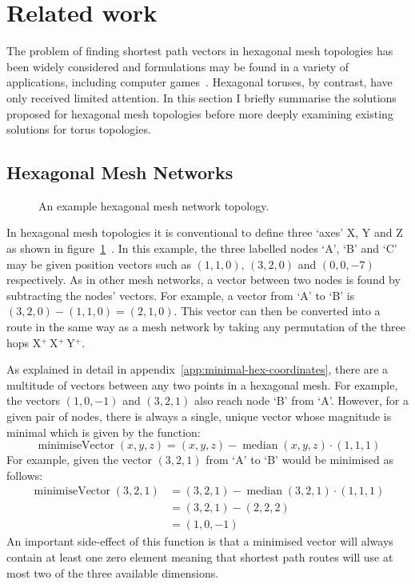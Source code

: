 	\section{Related work}
		
		The problem of finding shortest path vectors in hexagonal mesh topologies
		has been widely considered and formulations may be found in a variety of
		applications, including computer games~\cite{patel15}. Hexagonal
		toruses, by contrast, have only received limited attention. In this section I
		briefly summarise the solutions proposed for hexagonal mesh topologies
		before more deeply examining existing solutions for torus topologies.
		
		\subsection{Hexagonal Mesh Networks}
			
			\begin{figure}
				\center
				\caption{An example hexagonal mesh network topology.}
				\label{fig:hex-mesh-topology-coordinates}
			\end{figure}
			
			In hexagonal mesh topologies it is conventional to define three `axes' X,
			Y and Z as shown in
			figure~\ref{fig:hex-mesh-topology-coordinates}~\cite{patel15}. In this
			example, the three labelled nodes `A', `B' and `C' may be given position
			vectors such as $(1, 1, 0)$, $(3, 2, 0)$ and $(0, 0, -7)$ respectively.
			As in other mesh networks, a vector between two nodes is found by
			subtracting the nodes' vectors. For example, a vector from `A' to `B' is
			$(3, 2, 0) - (1, 1, 0) = (2, 1, 0)$. This vector can then be converted
			into a route in the same way as a mesh network by taking any permutation
			of the three hops  X$^+\,$X$^+\,$Y$^+$.
			
			As explained in detail in appendix~\ref{app:minimal-hex-coordinates},
			there are a multitude of vectors between any two points in a hexagonal
			mesh. For example, the vectors $(1, 0, -1)$ and $(3, 2, 1)$ also reach
			node `B' from `A'. However, for a given pair of nodes, there is always a
			single, unique vector whose magnitude is minimal which is given by the
			function:
			\begin{equation*}
				\operatorname{minimiseVector}(x,y,z) =
					(x,y,z) - \operatorname{median}(x,y,z) \cdot (1,1,1)
			\end{equation*}
			For example, given the vector $(3, 2, 1)$ from `A' to `B' would be
			minimised as follows:
			\begin{align*}
				\operatorname{minimiseVector}(3,2,1) &=
					(3,2,1) - \operatorname{median}(3,2,1) \cdot (1,1,1) \\
				&=
					(3,2,1) - (2,2,2) \\
				&=
					(1,0,-1)
			\end{align*}
			An important side-effect of this function is that a minimised vector will
			always contain at least one zero element meaning that shortest path
			routes will use at most two of the three available dimensions.
		

